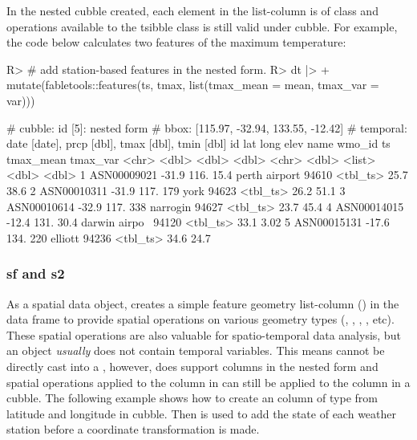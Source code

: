 \documentclass[
]{jss}
\begin{document}
In the nested cubble created, each element in the list-column 
is of  class and operations available to the tsibble class
is still valid under cubble. For example, the code below calculates two
features of the maximum temperature:

\begin{CodeChunk}
\begin{CodeInput}
R> # add station-based features in the nested form.
R> dt |>
+   mutate(fabletools::features(ts, tmax, list(tmax_mean = mean, tmax_var = var)))
\end{CodeInput}
\begin{CodeOutput}
# cubble:   id [5]: nested form
# bbox:     [115.97, -32.94, 133.55, -12.42]
# temporal: date [date], prcp [dbl], tmax [dbl], tmin [dbl]
  id            lat  long  elev name          wmo_id ts       tmax_mean tmax_var
  <chr>       <dbl> <dbl> <dbl> <chr>          <dbl> <list>       <dbl>    <dbl>
1 ASN00009021 -31.9  116.  15.4 perth airport  94610 <tbl_ts>      25.7    38.6 
2 ASN00010311 -31.9  117. 179   york           94623 <tbl_ts>      26.2    51.1 
3 ASN00010614 -32.9  117. 338   narrogin       94627 <tbl_ts>      23.7    45.4 
4 ASN00014015 -12.4  131.  30.4 darwin airpo~  94120 <tbl_ts>      33.1     3.02
5 ASN00015131 -17.6  134. 220   elliott        94236 <tbl_ts>      34.6    24.7 
\end{CodeOutput}
\end{CodeChunk}

\hypertarget{sf-and-s2}{%
\subsubsection{sf and s2}\label{sf-and-s2}}

As a spatial data object,  creates a simple feature geometry
list-column () in the data frame to provide spatial operations
on various geometry types (, ,
, , etc). These spatial operations are
also valuable for spatio-temporal data analysis, but an  object
\emph{usually} does not contain temporal variables. This means 
cannot be directly cast into a , however, 
does support  columns in the nested form and spatial
operations applied to the  column in  can still be
applied to the  column in a cubble. The following example
shows how to create an  column of  type from
latitude and longitude in cubble. Then  is used to
add the state  of each weather station before a
coordinate transformation is made.
\end{document}

